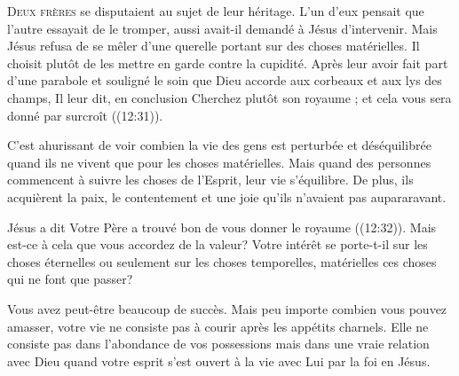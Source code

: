 

\lettrine{D}{eux frères} se disputaient au sujet de leur héritage.
 L'un d'eux pensait que l'autre essayait de le tromper,
 aussi avait-il demandé à Jésus d'intervenir.
 Mais Jésus refusa de se mêler d'une querelle portant
 sur des choses matérielles. Il choisit plutôt de les mettre en garde
 contre la cupidité. Après leur avoir fait part d'une parabole
 et souligné le soin que Dieu accorde aux corbeaux et aux lys des champs,
 Il leur dit, en conclusion\frcolon{} 
 \Og Cherchez plutôt son royaume ; et cela vous sera donné par surcroît \Fg{}
 ((12:31)). 


C'est ahurissant de voir combien la vie des gens est perturbée
 et déséquilibrée quand ils ne vivent que pour les choses matérielles.
 Mais quand des personnes commencent à suivre les choses de l'Esprit,
 leur vie s'équilibre. De plus, ils acquièrent la paix,
 le contentement et une joie qu'ils n'avaient pas aupararavant.

Jésus a dit\frcolon{} 
 \Og Votre Père a trouvé bon de vous donner le royaume \Fg{}
 ((12:32)). Mais est-ce à cela que vous accordez
 de la valeur? Votre intérêt se porte-t-il sur les choses éternelles
 ou seulement sur les choses temporelles, matérielles
 \ocadr ces choses qui ne font que passer?

Vous avez peut-être beaucoup de succès. Mais peu importe combien
 vous pouvez amasser, votre vie ne consiste pas à courir après
 les appétits charnels. Elle ne consiste pas dans l'abondance
 de vos possessions mais dans une vraie relation avec Dieu
 quand votre esprit s'est ouvert à la vie avec Lui par la foi en Jésus.

\dvrule




